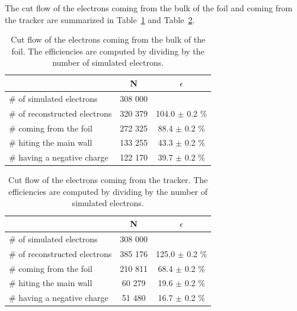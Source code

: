 \documentclass[main.tex]{subfiles}
\begin{document}
\bigskip


\noindent The cut flow of the electrons coming from the bulk of the foil and coming from the tracker are summarized in Table~\ref{Cutflowelectronbulk} and Table~\ref{Cutflowelectrontrackercomingfromthesource}.


\begin{table}[h!]
\begin{center}
\begin{tabular}{l|c|c}
 & N & $\epsilon$ \\
\toprule
$\#$ of simulated electrons & 308 000 & \\
\hline
$\#$ of reconstructed electrons & 320 379 & 104.0 $\pm$ 0.2 \% \\
$\#$ coming from the foil       & 272 325 & 88.4  $\pm$ 0.2 \% \\
$\#$ hiting the main wall       & 133 255 & 43.3  $\pm$ 0.2 \% \\
$\#$ having a negative charge   & 122 170 & 39.7  $\pm$ 0.2 \% \\
\bottomrule
\end{tabular}
\end{center}
\caption{Cut flow of the electrons coming from the bulk of the foil. The efficiencies are computed by dividing by the number of simulated electrons.}
\label{Cutflowelectronbulk}
\end{table}



\begin{table}[h!]
\begin{center}
\begin{tabular}{l|c|c}
 & N & $\epsilon$ \\
\toprule
$\#$ of simulated electrons & 308 000 & \\
\hline
$\#$ of reconstructed electrons & 385 176 & 125.0 $\pm$ 0.2 \% \\
$\#$ coming from the foil       & 210 811 & 68.4  $\pm$ 0.2 \%\\
$\#$ hiting the main wall       & 60 279  & 19.6  $\pm$ 0.2 \%\\
$\#$ having a negative charge   & 51 480  & 16.7  $\pm$ 0.2 \%\\
\bottomrule
\end{tabular}
\end{center}
\caption{Cut flow of the electrons coming from the tracker. The efficiencies are computed by dividing by the number of simulated electrons.}
\label{Cutflowelectrontrackercomingfromthesource}
\end{table}
\end{document}
